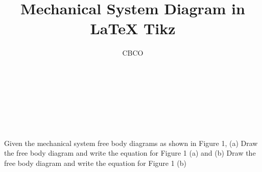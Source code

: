\documentclass[10pt,a4paper,leqno]{article}
\author{CBCO}
\title{Mechanical System Diagram in LaTeX Tikz}
\begin{document}
                              
\maketitle

\noindent \newcommand\CWht[1][2.5]{\tikz[baseline=-#1]{\draw[thick](0,0)     circle[radius=1.5mm];}}
 \par \ \par\noindent \newcommand\CBlk[1][2.5]{\tikz[baseline=-#1]{\draw[thick,    fill=black!](0,0) circle[radius=1.5mm];}}
 \par \ \par\noindent \begin{CJK*}{UTF8}{gbsn}
 \par \ \par\noindent Given the mechanical system free body diagrams as shown in Figure 1, (a) Draw the free body diagram and write the equation for Figure 1 (a) and (b) Draw the free body diagram and write the equation for Figure 1 (b) 
 \par \ \par\noindent \begin{figure}[H]\centering 


\end{figure}
\end{CJK*}
\end{document}
